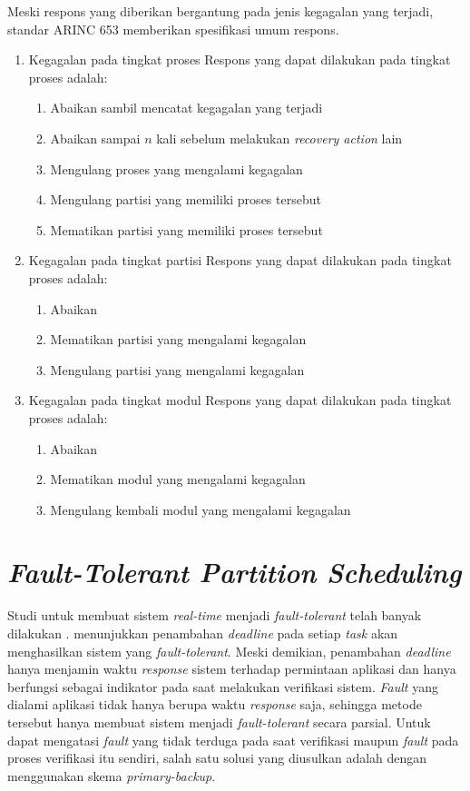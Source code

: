 Meski respons yang diberikan bergantung pada jenis kegagalan yang terjadi, standar ARINC 653
memberikan spesifikasi umum respons.
\begin{enumerate}
	\item Kegagalan pada tingkat proses
		Respons yang dapat dilakukan pada tingkat proses adalah:
		\begin{enumerate}
			\item Abaikan sambil mencatat kegagalan yang terjadi
			\item Abaikan sampai $n$ kali sebelum melakukan \textit{recovery action}
				lain
			\item Mengulang proses yang mengalami kegagalan
			\item Mengulang partisi yang memiliki proses tersebut
			\item Mematikan partisi yang memiliki proses tersebut
		\end{enumerate}
	\item Kegagalan pada tingkat partisi
		Respons yang dapat dilakukan pada tingkat proses adalah:
		\begin{enumerate}
			\item Abaikan
			\item Mematikan partisi yang mengalami kegagalan
			\item Mengulang partisi yang mengalami kegagalan
		\end{enumerate}

	\item Kegagalan pada tingkat modul
		Respons yang dapat dilakukan pada tingkat proses adalah:
		\begin{enumerate}
			\item Abaikan
			\item Mematikan modul yang mengalami kegagalan
			\item Mengulang kembali modul yang mengalami kegagalan
		\end{enumerate}
\end{enumerate}

\section{\textit{Fault-Tolerant Partition Scheduling}}

Studi untuk membuat sistem \textit{real-time} menjadi \textit{fault-tolerant} telah banyak
dilakukan \citep{Campbell1986} \citep{Bertossi2006}. \citet{Campbell1986} menunjukkan penambahan
\textit{deadline} pada setiap \textit{task} akan menghasilkan sistem yang
\textit{fault-tolerant}.  Meski demikian, penambahan \textit{deadline} hanya menjamin waktu
\textit{response} sistem terhadap permintaan aplikasi dan hanya berfungsi sebagai indikator pada
saat melakukan verifikasi sistem.  \textit{Fault} yang dialami aplikasi tidak hanya berupa waktu
\textit{response} saja, sehingga metode tersebut hanya membuat sistem menjadi
\textit{fault-tolerant} secara parsial.  Untuk dapat mengatasi \textit{fault} yang tidak terduga
pada saat verifikasi maupun \textit{fault} pada proses verifikasi itu sendiri, salah satu solusi
yang diusulkan adalah dengan menggunakan skema \textit{primary-backup}.

